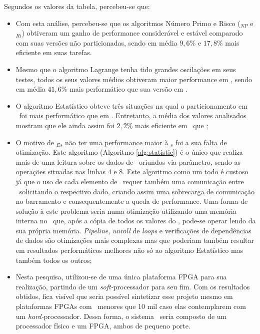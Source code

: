     
        Segundos os valores da tabela, percebeu-se que:
        \begin{itemize}
            \item 
            Com esta análise, percebeu-se que os algoritmos Número Primo e Risco (\Ss$_{NP}$ e \Ss$_{Ri}$) obtiveram um ganho de performance considerável e estável comparado com suas versões não particionadas, sendo em média $9,6\%$ e $17,8\%$ mais eficiente em suas tarefas.
            \item 
            Mesmo que o algoritmo Lagrange tenha tido grandes oscilações em seus testes, todos os seus valores médios obtiveram maior performance em \hardware, sendo em média $41,6\%$ mais performático que sua versão em \software.
            \item 
            O algoritmo Estatístico obteve três situações na qual o particionamento em \software\ foi mais performático que em \hardware.
            Entretanto, a média dos valores analisados mostram que ele ainda assim foi $2,2\%$ mais eficiente em \hardware\ que \software;
            \item 
            O motivo de \Ss$_{Es}$ não ter uma performance maior à \Ss$_{s}$ foi a sua falta de otimização.
            Este algoritmo (Algoritmo \ref{alg:statistic}) é o único que realiza mais de uma leitura sobre os dados de \buffer\ oriundos via parâmetro, sendo as operações situadas nas linhas 4 e 8.
            Este algoritmo como um todo é custoso já que o uso de cada elemento de \buffer\ requer também uma comunicação entre \hs\ solicitando o respectivo dado, criando assim uma sobrecarga de comunicação no barramento e consequentemente a queda de performance.
            Uma forma de solução à este problema seria numa otimização utilizando uma memória interna no \hardware\ que, após a cópia de todos os valores do \buffer, pode-se operar lendo da sua própria memória.
            \textit{Pipeline}, \textit{unroll} de \textit{loops} e verificações de dependências de dados são otimizações mais complexas mas que poderiam também resultar em resultados performáticos melhores não só ao algoritmo Estatístico mas também todos os outros;
            \item 
            Nesta pesquisa, utilizou-se de uma única plataforma FPGA para sua realização, partindo de um \textit{soft-}processador para seu fim.
            Com os resultados obtidos, fica visível que seria possível sintetizar esse projeto mesmo em plataformas FPGAs com \luts\ menores que 10 mil caso elas contemplarem com um \textit{hard-}processador.
            Dessa forma, o sistema \wearable\ seria composto de um processador físico e um FPGA, ambos de pequeno porte.
        \end{itemize}
        

